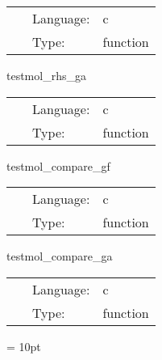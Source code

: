  \begin{tabular*}{160mm}{cll} 
~ & Language:  & c \\ 
~ & Type:  & function \\ 
\end{tabular*} 


\vspace{5mm}


\hspace{5mm} testmol\_rhs\_ga 

\hspace{5mm}{\it compute the rhs for the evolved grid function } 


\hspace{5mm}

 \begin{tabular*}{160mm}{cll} 
~ & Language:  & c \\ 
~ & Type:  & function \\ 
\end{tabular*} 


\vspace{5mm}


\hspace{5mm} testmol\_compare\_gf 

\hspace{5mm}{\it compare analytic and numerial result in grid function } 


\hspace{5mm}

 \begin{tabular*}{160mm}{cll} 
~ & Language:  & c \\ 
~ & Type:  & function \\ 
\end{tabular*} 


\vspace{5mm}


\hspace{5mm} testmol\_compare\_ga 

\hspace{5mm}{\it compare analytic and numerial result in grid array } 


\hspace{5mm}

 \begin{tabular*}{160mm}{cll} 
~ & Language:  & c \\ 
~ & Type:  & function \\ 
\end{tabular*} 



\vspace{5mm}\parskip = 10pt 

